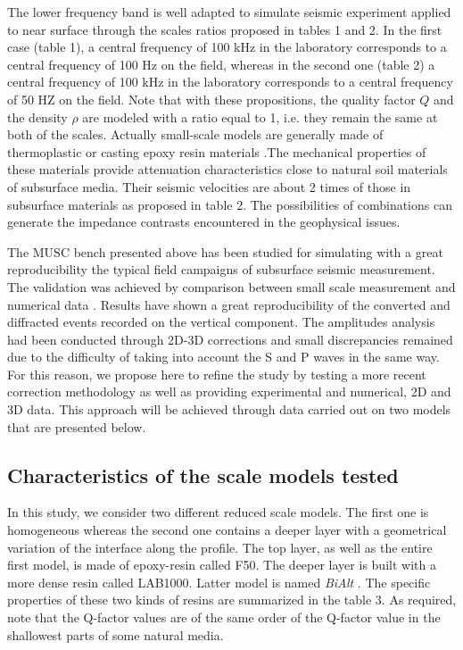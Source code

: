 \documentclass[manuscript,revised]{geophysics}
\newcommand{\bialt}{\textit{BiAlt} }
\begin{document}
\noindent The lower frequency band is well adapted to simulate seismic experiment applied to near surface through the scales ratios proposed in tables 1 and 2. In the first case (table 1), a central frequency of 100 kHz in the laboratory corresponds to a central frequency of 100 Hz on the field, whereas in the second one (table 2) a central frequency of 100 kHz in the laboratory corresponds to a central frequency of 50 HZ on the field. Note that with these propositions, the  quality factor $Q$ and the density $\rho$ are modeled with a ratio equal to 1, i.e. they remain the same at both of the scales. Actually small-scale models are generally made of thermoplastic or casting epoxy resin materials \citep{Bretaudeau_FWI_2013}.The mechanical properties of these materials provide attenuation characteristics close to natural soil materials of subsurface media. Their seismic velocities are about 2 times of those in subsurface materials as proposed in table 2. The possibilities of combinations can generate the impedance contrasts encountered in the geophysical issues. 

\noindent The MUSC bench presented above has been studied for simulating with a great reproducibility the typical field campaigns of subsurface seismic measurement. The validation was achieved by comparison between small scale measurement and numerical data \citep{Bretaudeau_SSM_2011}. Results have shown a great reproducibility of the converted and diffracted events recorded on the vertical component. The amplitudes analysis had been conducted through 2D-3D corrections and small discrepancies remained due to the difficulty of taking into account the S and P waves in the same way. For this reason, we propose here to refine the study by testing a more recent correction methodology \citet{Schafer_LSS_2014} as well as providing experimental and numerical, 2D and 3D data. This approach will be achieved through data carried out on two models that are presented below.


\subsection{Characteristics of the scale models tested}

\noindent In this study, we consider two different reduced scale models. The first one is homogeneous whereas the second one contains a deeper layer with a geometrical variation of the interface along the profile. The top layer, as well as the entire first model, is made of epoxy-resin called F50. The deeper layer is built with a more dense resin called LAB1000. Latter model is named \bialt. The specific properties of these two kinds of resins are summarized in the table 3. As required, note that the Q-factor values are of the same order of the Q-factor value in the shallowest parts of some natural media.
\end{document}
